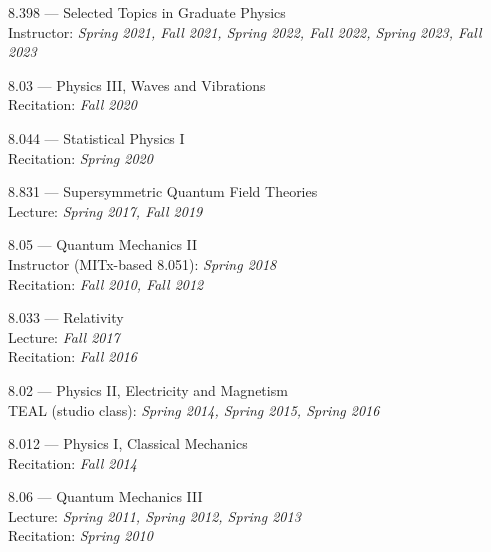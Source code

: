 \bbl
\item 8.398 --- Selected Topics in Graduate Physics
\\ Instructor: \emph{Spring 2021, Fall 2021, Spring 2022, Fall 2022, Spring 2023, Fall 2023}
\item 8.03 --- Physics III, Waves and Vibrations
\\ Recitation: \emph{Fall 2020}
\item 8.044 --- Statistical Physics I
\\ Recitation: \emph{Spring 2020}
\item 8.831 --- Supersymmetric Quantum Field Theories
\\ Lecture: \emph{Spring 2017, Fall 2019}
\item 8.05 --- Quantum Mechanics II
\\ Instructor (MITx-based 8.051): \emph{Spring 2018}
\\ Recitation: \emph{Fall 2010, Fall 2012}
\item 8.033 --- Relativity
\\ Lecture: \emph{Fall 2017}
\\ Recitation: \emph{Fall 2016}
\item 8.02 --- Physics II, Electricity and Magnetism
\\ TEAL (studio class): \emph{Spring 2014, Spring 2015, Spring 2016}
\item 8.012 --- Physics I, Classical Mechanics
\\ Recitation: \emph{Fall 2014}
\item 8.06 --- Quantum Mechanics III
\\ Lecture: \emph{Spring 2011, Spring 2012, Spring 2013}
\\ Recitation: \emph{Spring 2010}
\el
